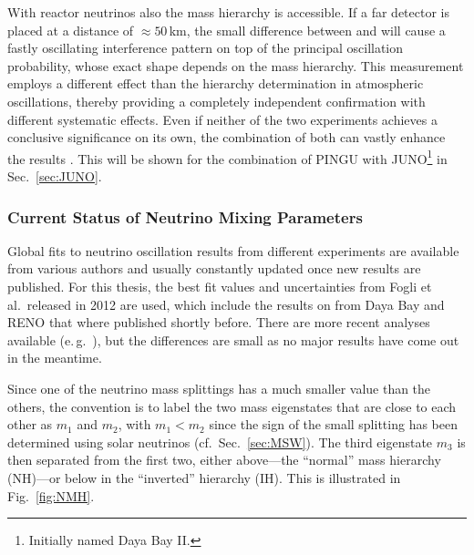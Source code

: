 With reactor neutrinos also the mass hierarchy is accessible. If a far detector
is placed at a distance of $\approx 50$\,km, the small difference between
 and  will cause a fastly oscillating interference pattern on top
of the principal oscillation probability, whose exact shape depends on the mass
hierarchy. This measurement employs a different effect than the hierarchy
determination in atmospheric oscillations, thereby providing a completely
independent confirmation with different systematic effects. Even if neither of
the two experiments achieves a conclusive significance on its own, the
combination of both can vastly enhance the results \cite{BlennowSchwetz}. This
will be shown for the combination of PINGU with JUNO\footnote{Initially
named Daya Bay II.} in Sec.~\ref{sec:JUNO}.

\subsubsection{Current Status of Neutrino Mixing Parameters}
\label{sec:MixingParams}

Global fits to neutrino oscillation results from different experiments are
available from various authors and usually constantly updated once new results
are published. For this thesis, the best fit values and uncertainties from Fogli
et al.\ released in 2012 \cite{Fogli2012} are used, which include the results
on  from Daya Bay and RENO that where published shortly before. There
are more recent analyses available (e.\,g.\ \cite{Capozzi2013,
GonzalezGarcia2014}), but the differences are small as no major results have
come out in the meantime.

Since one of the neutrino mass splittings has a much smaller value than the
others, the convention is to label the two mass eigenstates that are close to
each other as $m_1$ and $m_2$, with $m_1 < m_2$ since the sign of the small
splitting has been determined using solar neutrinos (cf.\ Sec.~\ref{sec:MSW}).
The third eigenstate $m_3$ is then separated from the first two, either
above---the ``normal'' mass hierarchy (NH)---or below in the ``inverted''
hierarchy (IH). This is illustrated in Fig.~\ref{fig:NMH}.

